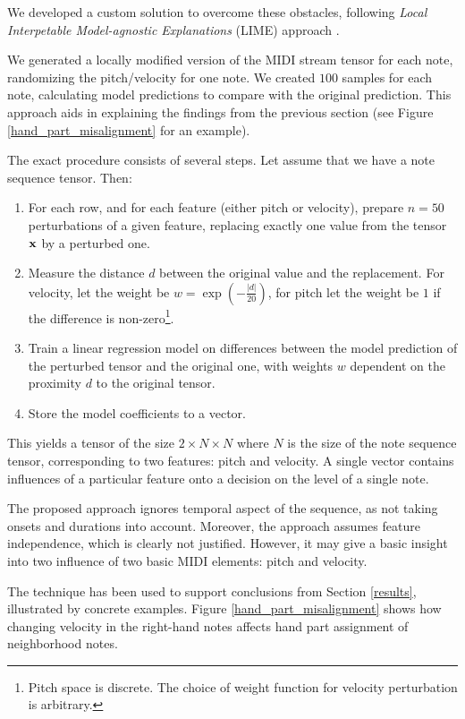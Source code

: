 We developed a custom solution to overcome these obstacles, following \emph{Local Interpetable Model-agnostic Explanations} (LIME) approach \cite{Ribeiro2016}.

We generated a locally modified version of the MIDI stream tensor for each note, randomizing the pitch/velocity for one note. We created $100$ samples for each note, calculating model predictions to compare with the original prediction. This approach aids in explaining the findings from the previous section (see Figure \ref{hand_part_misalignment} for an example).

The exact procedure consists of several steps. Let assume that we have a note sequence tensor. Then:\begin{enumerate}
	\item For each row, and for each feature (either pitch or velocity), prepare $n=50$ perturbations of a given feature, replacing exactly one value from the tensor ${\bf x}$ by a perturbed one.
	\item Measure the distance $d$ between the original value and the replacement. For velocity, let the weight be $w=\exp\left(-\tfrac{|d|}{20}\right)$, for pitch let the weight be $1$ if the difference is non-zero\footnote{Pitch space is discrete. The choice of weight function for velocity perturbation is arbitrary.}.
	\item Train a linear regression model on differences between the model prediction of the perturbed tensor and the original one, with weights $w$ dependent on the proximity $d$ to the original tensor.
	\item Store the model coefficients to a vector.
\end{enumerate}

This yields a tensor of the size $2 \times N \times N$ where $N$ is the size of the note sequence tensor, corresponding to two features: pitch and velocity. A single vector contains influences of a particular feature onto a decision on the level of a single note.

The proposed approach ignores temporal aspect of the sequence, as not taking onsets and durations into account. Moreover, the approach assumes feature independence, which is clearly not justified. However, it may give a basic insight into two influence of two basic MIDI elements: pitch and velocity.

The technique has been used to support conclusions from Section \ref{results}, illustrated by concrete examples. Figure \ref{hand_part_misalignment} shows how changing velocity in the right-hand notes affects hand part assignment of neighborhood notes. 

